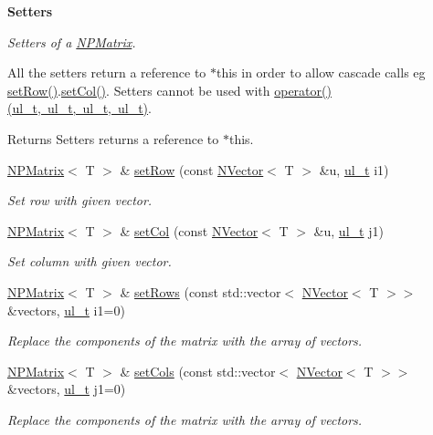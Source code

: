 \begin{Indent}\textbf{ Setters}\par
{\em Setters of a {\ttfamily \mbox{\hyperlink{class_n_p_matrix}{N\+P\+Matrix}}}.

All the setters return a reference to {\ttfamily $\ast$this} in order to allow cascade calls eg {\ttfamily \mbox{\hyperlink{class_n_p_matrix_aac65ad5cc7a3a73b8eddbd8501957ca6}{set\+Row()}}.\mbox{\hyperlink{class_n_p_matrix_ac950c160738743255b84702fca1e521d}{set\+Col()}}}. Setters cannot be used with {\ttfamily \mbox{\hyperlink{class_n_p_matrix_a5f7e5d337efe283e3f88716bd2205d55}{operator()(ul\+\_\+t, ul\+\_\+t, ul\+\_\+t, ul\+\_\+t)}}}. \begin{DoxyReturn}{Returns}
Setters returns a reference to {\ttfamily $\ast$this}. 
\end{DoxyReturn}
}\begin{DoxyCompactItemize}
\item 
\mbox{\hyperlink{class_n_p_matrix}{N\+P\+Matrix}}$<$ T $>$ \& \mbox{\hyperlink{class_n_p_matrix_aac65ad5cc7a3a73b8eddbd8501957ca6}{set\+Row}} (const \mbox{\hyperlink{class_n_vector}{N\+Vector}}$<$ T $>$ \&u, \mbox{\hyperlink{group___n_algebra_ga1b140a2034db3f5dfe18a987745df43a}{ul\+\_\+t}} i1)
\begin{DoxyCompactList}\small\item\em Set row with given vector. \end{DoxyCompactList}\item 
\mbox{\hyperlink{class_n_p_matrix}{N\+P\+Matrix}}$<$ T $>$ \& \mbox{\hyperlink{class_n_p_matrix_ac950c160738743255b84702fca1e521d}{set\+Col}} (const \mbox{\hyperlink{class_n_vector}{N\+Vector}}$<$ T $>$ \&u, \mbox{\hyperlink{group___n_algebra_ga1b140a2034db3f5dfe18a987745df43a}{ul\+\_\+t}} j1)
\begin{DoxyCompactList}\small\item\em Set column with given vector. \end{DoxyCompactList}\item 
\mbox{\hyperlink{class_n_p_matrix}{N\+P\+Matrix}}$<$ T $>$ \& \mbox{\hyperlink{class_n_p_matrix_af3dc4092df58ba94efe38e0c1c4591b7}{set\+Rows}} (const std\+::vector$<$ \mbox{\hyperlink{class_n_vector}{N\+Vector}}$<$ T $>$$>$ \&vectors, \mbox{\hyperlink{group___n_algebra_ga1b140a2034db3f5dfe18a987745df43a}{ul\+\_\+t}} i1=0)
\begin{DoxyCompactList}\small\item\em Replace the components of the matrix with the array of vectors. \end{DoxyCompactList}\item 
\mbox{\hyperlink{class_n_p_matrix}{N\+P\+Matrix}}$<$ T $>$ \& \mbox{\hyperlink{class_n_p_matrix_a3e3f383b3092d70144e1178da15c5376}{set\+Cols}} (const std\+::vector$<$ \mbox{\hyperlink{class_n_vector}{N\+Vector}}$<$ T $>$$>$ \&vectors, \mbox{\hyperlink{group___n_algebra_ga1b140a2034db3f5dfe18a987745df43a}{ul\+\_\+t}} j1=0)
\begin{DoxyCompactList}\small\item\em Replace the components of the matrix with the array of vectors. \end{DoxyCompactList}\end{DoxyCompactItemize}
\end{Indent}
